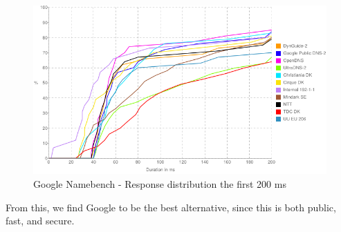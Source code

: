 \begin{figure}[H]
\centering
\includegraphics[width=150mm]{img/namebench_response_distro.png}
\caption{Google Namebench - Response distribution the first 200 ms}
\label{namebench_response_distro}
\end{figure}

From this, we find Google to be the best alternative, since this is both public, fast, and secure.